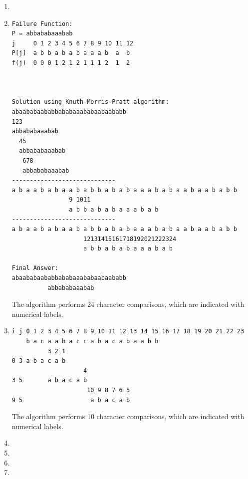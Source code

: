\documentclass[11pt,fleqn]{article}
\begin{document}
\begin{enumerate}
	\item $~$\\

	\item 
\begin{Verbatim}
Failure Function:
P = abbababaaabab
j     0 1 2 3 4 5 6 7 8 9 10 11 12
P[j]  a b b a b a b a a a b  a  b
f(j)  0 0 0 1 2 1 2 1 1 1 2  1  2



Solution using Knuth-Morris-Pratt algorithm:
abaababaababbababaaababaabaababb
123
abbababaaabab
  45
  abbababaaabab
   678
   abbababaaabab
-----------------------------
a b a a b a b a a b a b b a b a b a a a b a b a a b a a b a b b
                9 1011
                a b b a b a b a a a b a b
-----------------------------
a b a a b a b a a b a b b a b a b a a a b a b a a b a a b a b b
                    12131415161718192021222324
                    a b b a b a b a a a b a b

Final Answer:
abaababaababbababaaababaabaababb
          abbababaaabab
\end{Verbatim}
The algorithm performs 24 character comparisons, which are
indicated with numerical labels.

	\item 
\begin{Verbatim}
i j 0 1 2 3 4 5 6 7 8 9 10 11 12 13 14 15 16 17 18 19 20 21 22 23
    b a c a a b a c c a b a c a b a a b b
          3 2 1
0 3 a b a c a b
                    4
3 5       a b a c a b
                     10 9 8 7 6 5
9 5                   a b a c a b
\end{Verbatim}
The algorithm performs 10 character comparisons, which are
indicated with numerical labels.
	\item 

	\item 

	\item 

	\item 

\end{enumerate}
\end{document}
